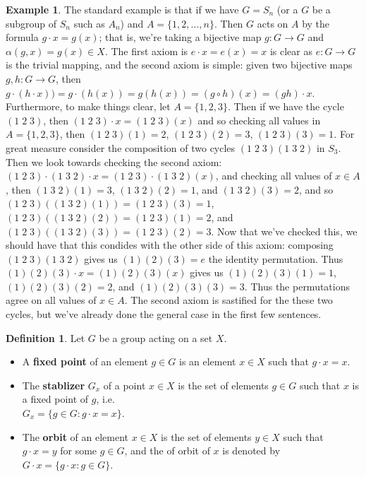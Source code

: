 \documentclass[9pt,reqno]{amsart}
\theoremstyle{definition}
\newtheorem{defi}{Definition}[section]
\newtheorem{ex}{Example}[section]
\begin{document}
\begin{ex}
The standard example is that if we have $G = S_n$ (or a $G$ be a subgroup of $S_n$ such as $A_n$) and $A = \{ 1, 2, \ldots, n \}$. Then $G$ acts on $A$ by the formula $g \cdot x = g(x)$; that is, we're taking a bijective map $g \colon G \to G$ and $\alpha (g, x) = g(x) \in X$. The first axiom is $e \cdot x = e(x) = x$ is clear as $e \colon G \to G$ is the trivial mapping, and the second axiom is simple: given two bijective maps $g, h \colon G \to G$, then $g \cdot (h \cdot x)) = g \cdot (h(x)) = g(h(x)) = (g \circ h)(x) = (gh)\cdot x$. Furthermore, to make things clear, let $A = \{1, 2,3 \}$. Then if we have the cycle $(1 \; 2 \; 3) $, then $(1 \; 2 \; 3)\cdot x = (1 \; 2 \; 3)(x)$ and so checking all values in $A = \{1, 2, 3 \}$, then $(1 \; 2 \; 3) (1) = 2$, $(1 \; 2 \; 3) (2) = 3$, $(1 \; 2 \; 3) (3) = 1$. For great measure consider the composition of two cycles $( 1 \; 2 \; 3) ( 1 \; 3 \; 2)$ in $S_3$. Then we look towards checking the second axiom: $(1 \; 2 \; 3) \cdot  (1 \; 3 \; 2) \cdot x  = (1 \; 2 \; 3) \cdot (1 \; 3 \; 2) (x)$, and checking all values of $x \in A$, then $(1 \; 3 \; 2) (1) = 3$, $(1 \; 3 \; 2) (2) = 1$, and $(1 \; 3 \; 2) (3) = 2$, and so $ (1 \; 2 \; 3) ((1 \; 3 \; 2) (1)) = (1 \; 2 \; 3) (3) = 1$, $ (1 \; 2 \; 3) ((1 \; 3 \; 2) (2)) = (1 \; 2 \; 3) (1) = 2$, and $ (1 \; 2 \; 3) ((1 \; 3 \; 2) (3)) = (1 \; 2 \; 3) (2) = 3$. Now that we've checked this, we should have that this condides with the other side of this axiom: composing $( 1 \; 2 \; 3) ( 1 \; 3 \; 2)$ gives us $(1) (2) (3) = e$ the identity permutation. Thus $(1) (2) (3) \cdot x = (1) (2) (3)(x)$ gives us $(1) (2) (3) (1) = 1$, $(1) (2) (3) (2) = 2$, and $(1) (2) (3) (3) = 3$. Thus the permutations agree on all values of $x \in A$. The second axiom is sastified for the these two cycles, but we've already done the general case in the first few sentences. 
\end{ex}
\begin{defi}Let $G$ be a group acting on a set $X$. 
\begin{itemize}
	\item A \textbf{fixed point} of an element $g \in G$ is an element $x \in X$ such that $g \cdot x = x$.
	\item The \textbf{stablizer}  $G_x$ of a point $x \in X$ is the set of elements $g \in G$ such that $x$ is a fixed point of $g$, i.e. \\ $G_x = \{g \in G \colon g \cdot x = x \}$. 
	\item The \textbf{orbit} of an element $x \in X$ is the set of elements $y \in X$ such that $g \cdot x = y$ for some $g \in G$, and the of orbit of $x$ is denoted by $G \cdot x = \{ g \cdot x \colon g \in G \}$. 
\end{itemize}
\end{defi}
\end{document}
